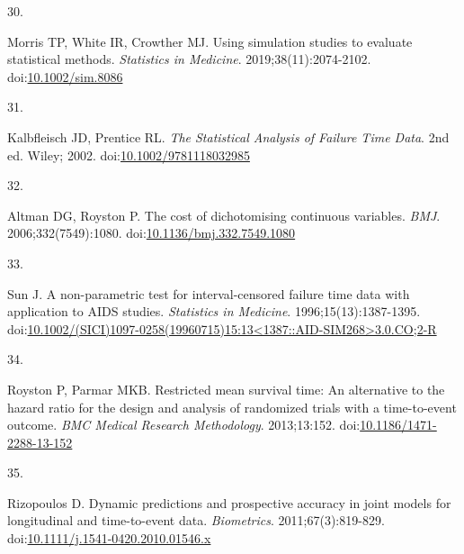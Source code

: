 \documentclass[
  11pt,
]{article}
\newlength{\cslhangindent}
\newlength{\csllabelwidth}
\newenvironment{CSLReferences}[2] %
 {\begin{list}{}{%
  \setlength{\itemindent}{0pt}
  \setlength{\leftmargin}{0pt}
  \setlength{\parsep}{0pt}
  \ifodd #1
   \setlength{\leftmargin}{\cslhangindent}
   \setlength{\itemindent}{-1\cslhangindent}
  \fi
  \setlength{\itemsep}{#2\baselineskip}}}
 {\end{list}}
\newcommand{\CSLLeftMargin}[1]{\parbox[t]{\csllabelwidth}{\strut#1\strut}}
\newcommand{\CSLRightInline}[1]{\parbox[t]{\linewidth - \csllabelwidth}{\strut#1\strut}}
\begin{document}
\begin{CSLReferences}{0}{1}
\CSLLeftMargin{30. }%
\CSLRightInline{Morris TP, White IR, Crowther MJ. Using simulation studies to evaluate statistical methods. \emph{Statistics in Medicine}. 2019;38(11):2074-2102. doi:\href{https://doi.org/10.1002/sim.8086}{10.1002/sim.8086}}

\CSLLeftMargin{31. }%
\CSLRightInline{Kalbfleisch JD, Prentice RL. \emph{The Statistical Analysis of Failure Time Data}. 2nd ed. Wiley; 2002. doi:\href{https://doi.org/10.1002/9781118032985}{10.1002/9781118032985}}

\CSLLeftMargin{32. }%
\CSLRightInline{Altman DG, Royston P. The cost of dichotomising continuous variables. \emph{BMJ}. 2006;332(7549):1080. doi:\href{https://doi.org/10.1136/bmj.332.7549.1080}{10.1136/bmj.332.7549.1080}}

\CSLLeftMargin{33. }%
\CSLRightInline{Sun J. A non-parametric test for interval-censored failure time data with application to {AIDS} studies. \emph{Statistics in Medicine}. 1996;15(13):1387-1395. doi:\href{https://doi.org/10.1002/(SICI)1097-0258(19960715)15:13\%3C1387::AID-SIM268\%3E3.0.CO;2-R}{10.1002/(SICI)1097-0258(19960715)15:13\textless1387::AID-SIM268\textgreater3.0.CO;2-R}}

\CSLLeftMargin{34. }%
\CSLRightInline{Royston P, Parmar MKB. Restricted mean survival time: An alternative to the hazard ratio for the design and analysis of randomized trials with a time-to-event outcome. \emph{BMC Medical Research Methodology}. 2013;13:152. doi:\href{https://doi.org/10.1186/1471-2288-13-152}{10.1186/1471-2288-13-152}}

\CSLLeftMargin{35. }%
\CSLRightInline{Rizopoulos D. Dynamic predictions and prospective accuracy in joint models for longitudinal and time-to-event data. \emph{Biometrics}. 2011;67(3):819-829. doi:\href{https://doi.org/10.1111/j.1541-0420.2010.01546.x}{10.1111/j.1541-0420.2010.01546.x}}

\end{CSLReferences}
\end{document}
